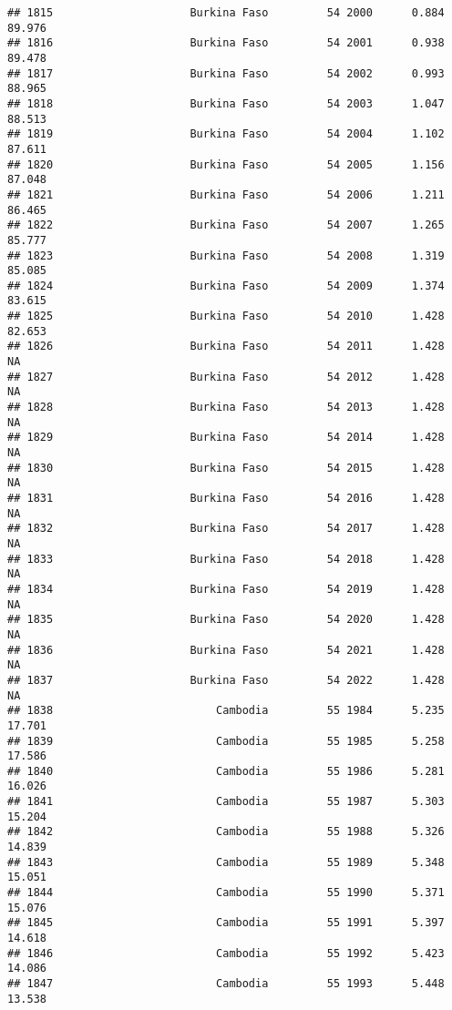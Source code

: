 \documentclass[
]{article}
\begin{document}
\begin{verbatim}
## 1815                     Burkina Faso         54 2000      0.884     89.976
## 1816                     Burkina Faso         54 2001      0.938     89.478
## 1817                     Burkina Faso         54 2002      0.993     88.965
## 1818                     Burkina Faso         54 2003      1.047     88.513
## 1819                     Burkina Faso         54 2004      1.102     87.611
## 1820                     Burkina Faso         54 2005      1.156     87.048
## 1821                     Burkina Faso         54 2006      1.211     86.465
## 1822                     Burkina Faso         54 2007      1.265     85.777
## 1823                     Burkina Faso         54 2008      1.319     85.085
## 1824                     Burkina Faso         54 2009      1.374     83.615
## 1825                     Burkina Faso         54 2010      1.428     82.653
## 1826                     Burkina Faso         54 2011      1.428         NA
## 1827                     Burkina Faso         54 2012      1.428         NA
## 1828                     Burkina Faso         54 2013      1.428         NA
## 1829                     Burkina Faso         54 2014      1.428         NA
## 1830                     Burkina Faso         54 2015      1.428         NA
## 1831                     Burkina Faso         54 2016      1.428         NA
## 1832                     Burkina Faso         54 2017      1.428         NA
## 1833                     Burkina Faso         54 2018      1.428         NA
## 1834                     Burkina Faso         54 2019      1.428         NA
## 1835                     Burkina Faso         54 2020      1.428         NA
## 1836                     Burkina Faso         54 2021      1.428         NA
## 1837                     Burkina Faso         54 2022      1.428         NA
## 1838                         Cambodia         55 1984      5.235     17.701
## 1839                         Cambodia         55 1985      5.258     17.586
## 1840                         Cambodia         55 1986      5.281     16.026
## 1841                         Cambodia         55 1987      5.303     15.204
## 1842                         Cambodia         55 1988      5.326     14.839
## 1843                         Cambodia         55 1989      5.348     15.051
## 1844                         Cambodia         55 1990      5.371     15.076
## 1845                         Cambodia         55 1991      5.397     14.618
## 1846                         Cambodia         55 1992      5.423     14.086
## 1847                         Cambodia         55 1993      5.448     13.538

\end{verbatim}
\end{document}
